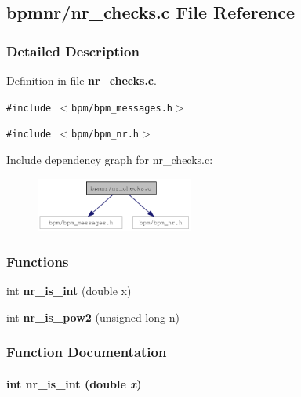 \subsection{bpmnr/nr\_\-checks.c File Reference}
\label{nr__checks_8c}


\subsubsection{Detailed Description}


Definition in file {\bf nr\_\-checks.c}.

{\tt \#include $<$bpm/bpm\_\-messages.h$>$}\par
{\tt \#include $<$bpm/bpm\_\-nr.h$>$}\par


Include dependency graph for nr\_\-checks.c:\nopagebreak
\begin{figure}[H]
\begin{center}
\leavevmode
\includegraphics[width=147pt]{nr__checks_8c__incl}
\end{center}
\end{figure}
\subsubsection*{Functions}
\begin{CompactItemize}
\item 
int {\bf nr\_\-is\_\-int} (double x)
\item 
int {\bf nr\_\-is\_\-pow2} (unsigned long n)
\end{CompactItemize}


\subsubsection{Function Documentation}
\paragraph[nr\_\-is\_\-int]{\setlength{\rightskip}{0pt plus 5cm}int nr\_\-is\_\-int (double {\em x})}\hfill\label{nr__checks_8c_0f1f21216d96e661d4ba6b91e91538ed}


